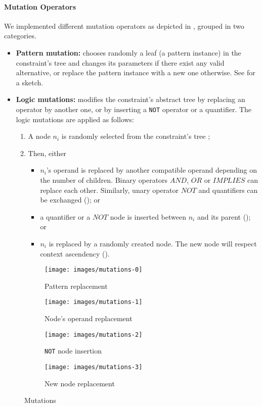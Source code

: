 \paragraph{Mutation Operators}
We implemented different mutation operators as depicted in , grouped in two categories.
\begin{itemize}
	\item \textbf{Pattern mutation:} chooses randomly a leaf (\ie a pattern instance) in the constraint's tree and changes its parameters if there exist any valid alternative, or replace the pattern instance with a new one otherwise. See  for a sketch.
	\item \textbf{Logic mutations:} modifies the constraint's abstract tree by replacing an operator by another one, or by inserting a \texttt{NOT} operator or a quantifier. The logic mutations are applied as follows:
	\begin{enumerate}
		\item A node $n_i$ is randomly selected from the constraint's tree ;
		\item Then, either
		\begin{itemize}
			\item $n_i$'s operand is replaced by another  compatible operand depending on the number of children. Binary operators $AND$, $OR$ or $IMPLIES$ can replace each other. Similarly, unary operator $NOT$ and quantifiers can be exchanged (); or
			\item a quantifier or a $NOT$ node is inserted between $n_i$ and its parent (); or
			\item $n_i$ is replaced by a randomly created node. The new node will respect context ascendency (). 
		\end{itemize}
	\end{enumerate}
\end{itemize}


\begin{figure}[h]
	\centering
	\begin{subfigure}{.50\linewidth}
		\centering
		\texttt{[image: images/mutations-0]}
		\caption{Pattern replacement}
		\label{fig:mutations-0}
	\end{subfigure}
	\begin{subfigure}{.48\linewidth}
		\centering
		\texttt{[image: images/mutations-1]}
		\caption{Node's operand replacement}
		\label{fig:mutations-1}
	\end{subfigure}
	\begin{subfigure}{.48\linewidth}
		\centering
		\texttt{[image: images/mutations-2]}
		\caption{\texttt{NOT} node insertion}
		\label{fig:mutations-2}
	\end{subfigure}
	\begin{subfigure}{.48\linewidth}
		\centering
		\texttt{[image: images/mutations-3]}
		\caption{New node replacement}
		\label{fig:mutations-3}
	\end{subfigure}
	\caption{Mutations}
	\label{fig:mutations}
\end{figure}


